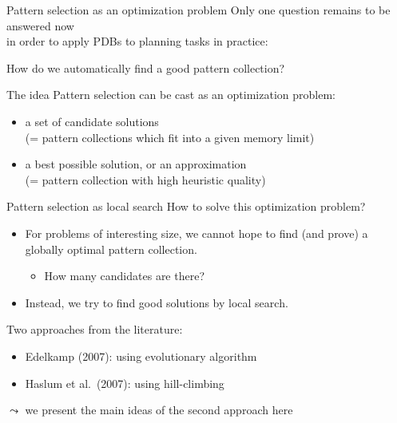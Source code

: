 \documentclass{gkibeamer}
\begin{document}
\begin{frame}{Pattern selection as an optimization problem}
  Only one question remains to be answered now \\
  in order to apply PDBs to planning tasks in practice:

  \smallskip

  \alert{How do we automatically find a good pattern collection?}

  \medskip

  \begin{block}{The idea}
    Pattern selection can be cast as an \alert{optimization problem}:
    \begin{itemize}
    \item {} a set of \alert{candidate solutions} \\
      (= pattern collections which fit into a given memory limit)
    \item {} a \alert{best possible} solution, or an
      approximation \\
      (= pattern collection with high heuristic quality)
    \end{itemize}
  \end{block}
\end{frame}

\begin{frame}{Pattern selection as local search}
  How to solve this optimization problem?
  \begin{itemize}
  \item For problems of interesting size, we cannot hope to
    find (and prove) a \alert{globally optimal} pattern collection.
    \begin{itemize}
    \item {} How many candidates are there?
    \end{itemize}
  \item Instead, we try to find \alert{good} solutions by \alert{local
    search}.
  \end{itemize}

  \bigskip

  Two approaches from the literature:
  \begin{itemize}
  \item Edelkamp (2007): using \alert{evolutionary algorithm}
  \item Haslum et al.\ (2007): using \alert{hill-climbing}
  \end{itemize}
  $\leadsto$ we present the main ideas of the second approach here
\end{frame}
\end{document}
